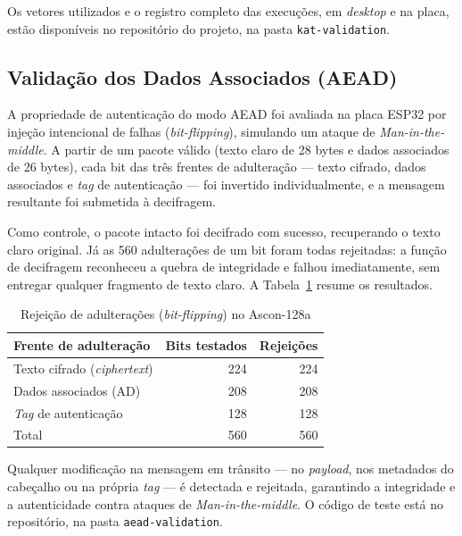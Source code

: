 Os vetores utilizados e o registro completo das execuções, em \textit{desktop} e na placa, estão disponíveis no repositório do projeto, na pasta \texttt{kat-validation}.


\subsection{Validação dos Dados Associados (AEAD)}

A propriedade de autenticação do modo AEAD foi avaliada na placa ESP32 por injeção intencional de falhas (\textit{bit-flipping}), simulando um ataque de \textit{Man-in-the-middle}. A partir de um pacote válido (texto claro de 28 bytes e dados associados de 26 bytes), cada bit das três frentes de adulteração — texto cifrado, dados associados e \textit{tag} de autenticação — foi invertido individualmente, e a mensagem resultante foi submetida à decifragem.

Como controle, o pacote intacto foi decifrado com sucesso, recuperando o texto claro original. Já as 560 adulterações de um bit foram todas rejeitadas: a função de decifragem reconheceu a quebra de integridade e falhou imediatamente, sem entregar qualquer fragmento de texto claro. A Tabela~\ref{tab:aead_ascon128a} resume os resultados.

\begin{table}[htb]
\centering
\caption{Rejeição de adulterações (\textit{bit-flipping}) no Ascon-128a}
\label{tab:aead_ascon128a}
\begin{tabular}{lrr}
\hline
\textbf{Frente de adulteração} & \textbf{Bits testados} & \textbf{Rejeições} \\
\hline
Texto cifrado (\textit{ciphertext}) & 224 & 224 \\
Dados associados (AD)               & 208 & 208 \\
\textit{Tag} de autenticação        & 128 & 128 \\
\hline
Total                               & 560 & 560 \\
\hline
\end{tabular}
\end{table}

Qualquer modificação na mensagem em trânsito — no \textit{payload}, nos metadados do cabeçalho ou na própria \textit{tag} — é detectada e rejeitada, garantindo a integridade e a autenticidade contra ataques de \textit{Man-in-the-middle}. O código de teste está no repositório, na pasta \texttt{aead-validation}.

